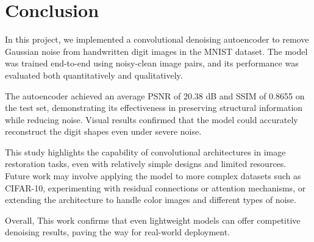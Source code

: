 \section{Conclusion}

In this project, we implemented a convolutional denoising autoencoder to remove Gaussian noise from handwritten digit images in the MNIST dataset. The model was trained end-to-end using noisy-clean image pairs, and its performance was evaluated both quantitatively and qualitatively.

The autoencoder achieved an average PSNR of 20.38 dB and SSIM of 0.8655 on the test set, demonstrating its effectiveness in preserving structural information while reducing noise. Visual results confirmed that the model could accurately reconstruct the digit shapes even under severe noise.

This study highlights the capability of convolutional architectures in image restoration tasks, even with relatively simple designs and limited resources. Future work may involve applying the model to more complex datasets such as CIFAR-10, experimenting with residual connections or attention mechanisms, or extending the architecture to handle color images and different types of noise.

Overall, This work confirms that even lightweight models can offer competitive denoising results, paving the way for real-world deployment.